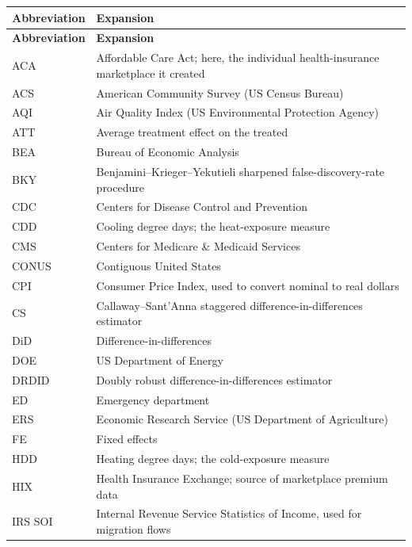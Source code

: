 \begingroup
\small
\setlength{\tabcolsep}{6pt}
\begin{longtable}{@{}p{2.4cm}p{12.2cm}@{}}
\toprule
\textbf{Abbreviation} & \textbf{Expansion} \\
\midrule
\endfirsthead
\toprule
\textbf{Abbreviation} & \textbf{Expansion} \\
\midrule
\endhead
\bottomrule
\endfoot

ACA   & Affordable Care Act; here, the individual health-insurance marketplace it created \\
ACS   & American Community Survey (US Census Bureau) \\
AQI   & Air Quality Index (US Environmental Protection Agency) \\
ATT   & Average treatment effect on the treated \\
BEA   & Bureau of Economic Analysis \\
BKY   & Benjamini--Krieger--Yekutieli sharpened false-discovery-rate procedure \\
CDC   & Centers for Disease Control and Prevention \\
CDD   & Cooling degree days; the heat-exposure measure \\
CMS   & Centers for Medicare \& Medicaid Services \\
CONUS & Contiguous United States \\
CPI   & Consumer Price Index, used to convert nominal to real dollars \\
CS    & Callaway--Sant'Anna staggered difference-in-differences estimator \\
DiD   & Difference-in-differences \\
DOE   & US Department of Energy \\
DRDID & Doubly robust difference-in-differences estimator \\
ED    & Emergency department \\
ERS   & Economic Research Service (US Department of Agriculture) \\
FE    & Fixed effects \\
HDD   & Heating degree days; the cold-exposure measure \\
HIX   & Health Insurance Exchange; source of marketplace premium data \\
IRS SOI & Internal Revenue Service Statistics of Income, used for migration flows \\

\end{longtable}
